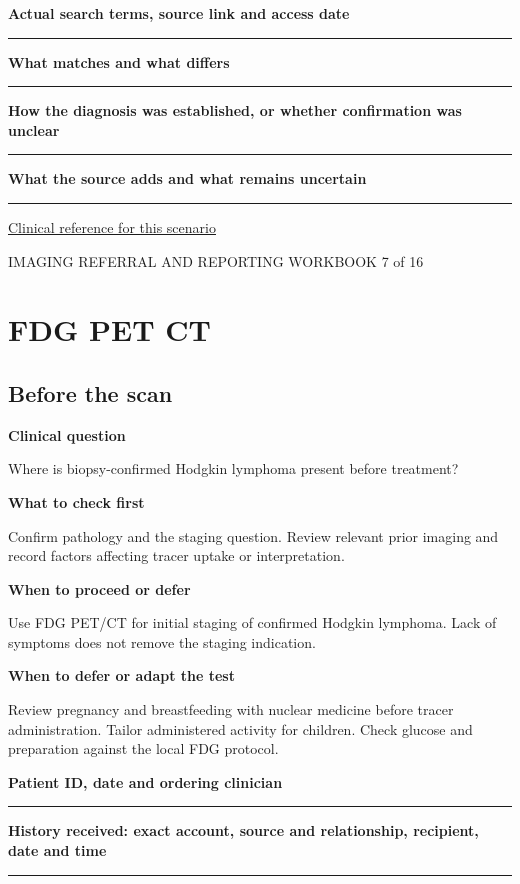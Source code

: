 \documentclass[11pt,a4paper]{article}
\newcommand{\record}[1]{\textbf{#1}\par\vspace{0.55\baselineskip}\hrule\vspace{0.35\baselineskip}}
\begin{document}
\record{Actual search terms, source link and access date}

\record{What matches and what differs}

\record{How the diagnosis was established, or whether confirmation was unclear}

\record{What the source adds and what remains uncertain}

\small\href{https://www.aaojournal.org/article/S0161-6420(19)32902-5/fulltext/}{Clinical reference for this scenario}

\normalsize

\newpage

{\small IMAGING REFERRAL AND REPORTING WORKBOOK \hfill 7 of 16}

\section*{FDG PET CT}

\subsection*{Before the scan}

\textbf{Clinical question}\par Where is biopsy-confirmed Hodgkin lymphoma present before treatment?\par

\textbf{What to check first}\par Confirm pathology and the staging question. Review relevant prior imaging and record factors affecting tracer uptake or interpretation.\par

\textbf{When to proceed or defer}\par Use FDG PET/CT for initial staging of confirmed Hodgkin lymphoma. Lack of symptoms does not remove the staging indication.\par

\textbf{When to defer or adapt the test}\par Review pregnancy and breastfeeding with nuclear medicine before tracer administration. Tailor administered activity for children. Check glucose and preparation against the local FDG protocol.\par

\record{Patient ID, date and ordering clinician}

\record{History received: exact account, source and relationship, recipient, date and time}
\end{document}
